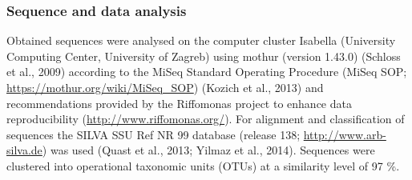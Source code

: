 \documentclass[
  12pt,
]{article}
\begin{document}
\hypertarget{sequence-and-data-analysis}{%
\subsubsection{Sequence and data
analysis}\label{sequence-and-data-analysis}}

Obtained sequences were analysed on the computer cluster Isabella
(University Computing Center, University of Zagreb) using mothur
(version 1.43.0) (Schloss et al., 2009) according to the MiSeq Standard
Operating Procedure (MiSeq SOP; \url{https://mothur.org/wiki/MiSeq_SOP})
(Kozich et al., 2013) and recommendations provided by the Riffomonas
project to enhance data reproducibility
(\url{http://www.riffomonas.org/}). For alignment and classification of
sequences the SILVA SSU Ref NR 99 database (release 138;
\url{http://www.arb-silva.de}) was used (Quast et al., 2013; Yilmaz et
al., 2014). Sequences were clustered into operational taxonomic units
(OTUs) at a similarity level of 97 \si{\percent}.
\end{document}
